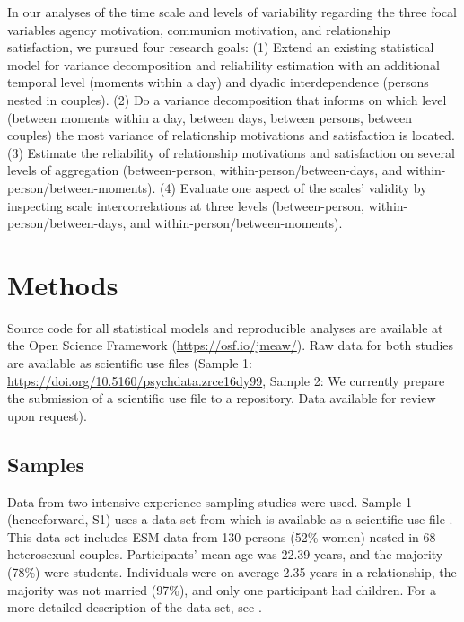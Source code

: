\documentclass[jou,a4paper,draftfirst]{apa6}\usepackage[]{graphicx}\usepackage[]{color}
\begin{document}
In our analyses of the time scale and levels of variability regarding the three focal variables agency motivation, communion motivation, and relationship satisfaction, we pursued four research goals:
(1) Extend an existing statistical model for variance decomposition and reliability estimation \parencite{cranford_ProcedureEvaluatingSensitivity_2006} with an additional temporal level (moments within a day) and dyadic interdependence (persons nested in couples). (2) Do a variance decomposition that informs on which level (between moments within a day, between days, between persons, between couples) the most variance of relationship motivations and satisfaction is located. (3) Estimate the reliability of relationship motivations and satisfaction on several levels of aggregation (between-person, within-person/between-days, and within-person/between-moments). (4) Evaluate one aspect of the scales’ validity by inspecting scale intercorrelations at three levels (between-person, within-person/between-days, and within-person/between-moments).      

\section{Methods}

Source code for all statistical models and reproducible analyses are available at the Open Science Framework (\url{https://osf.io/jmeaw/}).
Raw data for both studies are available as scientific use files (Sample 1: \url{https://doi.org/10.5160/psychdata.zrce16dy99}, Sample 2: We currently prepare the submission of a scientific use file to a repository. Data available for review upon request).

\subsection{Samples}

Data from two intensive experience sampling studies were used. Sample 1 (henceforward, S1) uses a data set from \textcite{zygar_MotiveDispositionsStates_2018} which is available as a scientific use file \parencite{zygar_MotiveDispositionsStates_2018a}. This data set includes ESM data from 130 persons (52\% women) nested in 68 heterosexual couples. Participants' mean age was 22.39 years, and the majority (78\%) were students. Individuals were on average 2.35 years in a relationship, the majority was not married (97\%), and only one participant had children. For a more detailed description of the data set, see \textcite{zygar_MotiveDispositionsStates_2018}.
\end{document}
